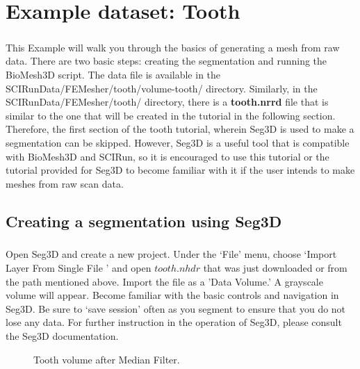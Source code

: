 \documentclass[fleqn,12pt,openany]{book}
\begin{document}
\chapter{Example dataset: Tooth}
\label{chapter:tooth}
\paragraph{}
This Example will walk you through the basics of generating a mesh from raw data. 
There are two basic steps: creating the segmentation and running the BioMesh3D 
script. The data file is available in the SCIRunData/FEMesher/tooth/volume-tooth/ 
directory.  Similarly, in the SCIRunData/FEMesher/tooth/ directory, there is a 
{\bf tooth.nrrd} file that is similar to the one that will be created in the 
tutorial in the following section.  Therefore, the first section of the tooth 
tutorial, wherein Seg3D is used to make a segmentation can be skipped. 
 However, Seg3D is a useful tool that is compatible with BioMesh3D and SCIRun, 
 so it is encouraged to use this tutorial or the tutorial provided for Seg3D to 
 become familiar with it if the user intends to make meshes from raw scan data.

\section{Creating a segmentation using Seg3D}

\paragraph{}
Open Seg3D and create a new project.  Under the `File' menu, choose `Import Layer From Single File ' and open $tooth.nhdr$ that was just downloaded or from the path mentioned above.  Import
the file as a 'Data Volume.'  A grayscale volume 
will appear.  Become familiar with the basic controls and navigation in Seg3D.  
Be sure to `save session' often as you segment to ensure that you do not lose 
any data.  For further instruction in the operation of Seg3D, please consult 
the Seg3D documentation.

\begin{figure}
\caption{\label{fig:tooth_filtered} Tooth volume after Median Filter.}
\end{figure} 
 
\end{document}
